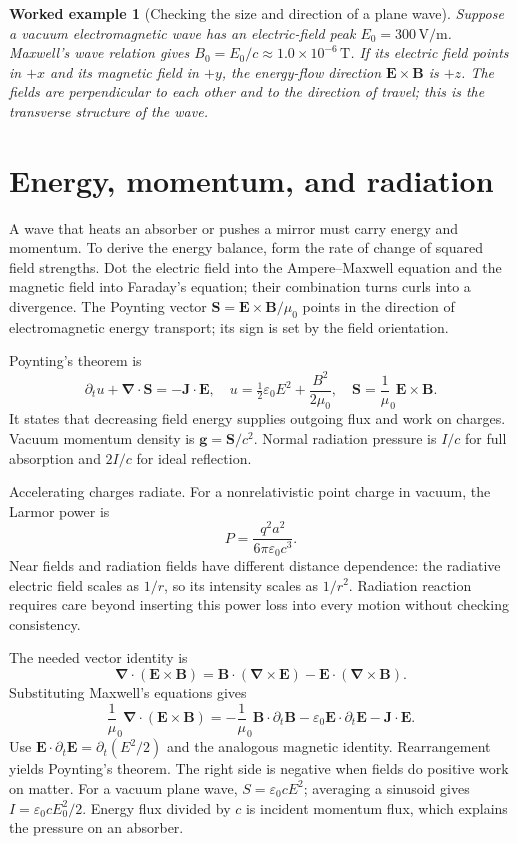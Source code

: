 \documentclass[11pt,oneside]{book}
\newcommand{\vect}[1]{\boldsymbol{#1}}
\newcommand{\grad}{\boldsymbol{\nabla}}
\newcommand{\eps}{\varepsilon_0}
\newcommand{\mun}{\mu_0}
\theoremstyle{reviewstyle}
\newtheorem{example}{Worked example}[chapter]
\begin{document}
\begin{example}[Checking the size and direction of a plane wave]
Suppose a vacuum electromagnetic wave has an electric-field peak $E_0=300\,\mathrm{V/m}$. Maxwell's wave relation gives $B_0=E_0/c\approx1.0\times10^{-6}\,\mathrm T$. If its electric field points in $+x$ and its magnetic field in $+y$, the energy-flow direction $\vect E\times\vect B$ is $+z$. The fields are perpendicular to each other and to the direction of travel; this is the transverse structure of the wave.
\end{example}

\section{Energy, momentum, and radiation}
A wave that heats an absorber or pushes a mirror must carry energy and momentum. To derive the energy balance, form the rate of change of squared field strengths. Dot the electric field into the Ampere--Maxwell equation and the magnetic field into Faraday's equation; their combination turns curls into a divergence. The Poynting vector $\vect S=\vect E\times\vect B/\mun$ points in the direction of electromagnetic energy transport; its sign is set by the field orientation.

Poynting's theorem is
\begin{equation}
\partial_tu+\grad\cdot\vect S=-\vect J\cdot\vect E,
\quad u=\tfrac12\eps E^2+\frac{B^2}{2\mun},\quad
\vect S=\frac1\mun\vect E\times\vect B.
\end{equation}
It states that decreasing field energy supplies outgoing flux and work on charges. Vacuum momentum density is $\vect g=\vect S/c^2$. Normal radiation pressure is $I/c$ for full absorption and $2I/c$ for ideal reflection.

Accelerating charges radiate. For a nonrelativistic point charge in vacuum, the Larmor power is
\begin{equation}P=\frac{q^2a^2}{6\pi\eps c^3}.\end{equation}
Near fields and radiation fields have different distance dependence: the radiative electric field scales as $1/r$, so its intensity scales as $1/r^2$. Radiation reaction requires care beyond inserting this power loss into every motion without checking consistency.

The needed vector identity is
\begin{equation}
\grad\cdot(\vect E\times\vect B)
=\vect B\cdot(\grad\times\vect E)-\vect E\cdot(\grad\times\vect B).
\end{equation}
Substituting Maxwell's equations gives
\begin{equation}
\frac1\mun\grad\cdot(\vect E\times\vect B)
=-\frac1\mun\vect B\cdot\partial_t\vect B
-\eps\vect E\cdot\partial_t\vect E-\vect J\cdot\vect E.
\end{equation}
Use $\vect E\cdot\partial_t\vect E=\partial_t(E^2/2)$ and the analogous magnetic identity. Rearrangement yields Poynting's theorem. The right side is negative when fields do positive work on matter. For a vacuum plane wave, $S=\eps cE^2$; averaging a sinusoid gives $I=\eps cE_0^2/2$. Energy flux divided by $c$ is incident momentum flux, which explains the pressure on an absorber.
\end{document}
